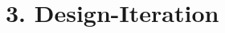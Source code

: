 \documentclass[.../Dokumentation.tex]{subfiles}
\begin{document}
    \section{3. Design-Iteration}\label{sec-ita3}
\end{document}
